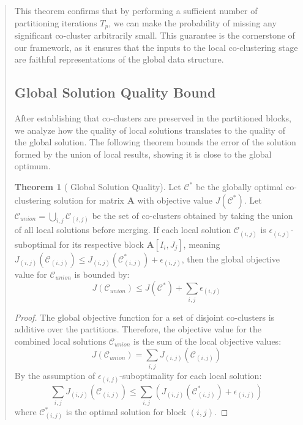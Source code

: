 \documentclass{ar2rc}
\theoremstyle{definition}
\newtheorem*{theorem*}{Theorem}
\theoremstyle{remark} %
\begin{document}
\begin{quote}
  This theorem confirms that by performing a sufficient number of partitioning iterations $T_p$, we can make the probability of missing any significant co-cluster arbitrarily small. This guarantee is the cornerstone of our framework, as it ensures that the inputs to the local co-clustering stage are faithful representations of the global data structure.

  \subsection*{ Global Solution Quality Bound}
  After establishing that co-clusters are preserved in the partitioned blocks, we analyze how the quality of local solutions translates to the quality of the global solution. The following theorem bounds the error of the solution formed by the union of local results, showing it is close to the global optimum.

  \begin{theorem*}[ Global Solution Quality]
    Let $\mathcal{C}^*$ be the globally optimal co-clustering solution for matrix $\mathbf{A}$ with objective value $J(\mathcal{C}^*)$. Let $\mathcal{C}_{union} = \bigcup_{i,j} \mathcal{C}_{(i,j)}$ be the set of co-clusters obtained by taking the union of all local solutions before merging. If each local solution $\mathcal{C}_{(i,j)}$ is $\epsilon_{(i,j)}$-suboptimal for its respective block $\mathbf{A}[I_i, J_j]$, meaning $J_{(i,j)}(\mathcal{C}_{(i,j)}) \le J_{(i,j)}(\mathcal{C}_{(i,j)}^*) + \epsilon_{(i,j)}$, then the global objective value for $\mathcal{C}_{union}$ is bounded by:
    \begin{equation}
      J(\mathcal{C}_{union}) \le J(\mathcal{C}^*) + \sum_{i,j} \epsilon_{(i,j)}
    \end{equation}
  \end{theorem*}
  \begin{proof}
    The global objective function for a set of disjoint co-clusters is additive over the partitions. Therefore, the objective value for the combined local solutions $\mathcal{C}_{union}$ is the sum of the local objective values:
    \begin{equation}
      J(\mathcal{C}_{union}) = \sum_{i,j} J_{(i,j)}(\mathcal{C}_{(i,j)})
    \end{equation}
    By the assumption of $\epsilon_{(i,j)}$-suboptimality for each local solution:
    \begin{equation}
      \sum_{i,j} J_{(i,j)}(\mathcal{C}_{(i,j)}) \le \sum_{i,j} \left( J_{(i,j)}(\mathcal{C}_{(i,j)}^*) + \epsilon_{(i,j)} \right)
    \end{equation}
    where $\mathcal{C}_{(i,j)}^*$ is the optimal solution for block $(i,j)$.


\end{proof}
\end{quote}
\end{document}
